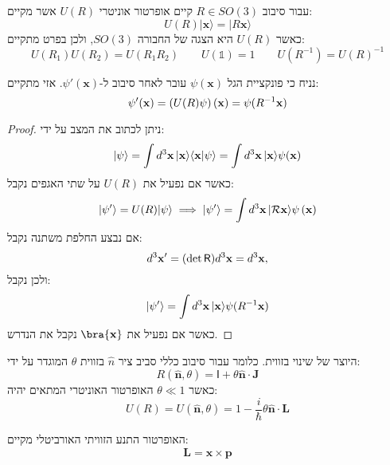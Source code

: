 \documentclass{tstextbook}
\begin{document}
\begin{reminder}
עבור סיבוב \(R \in SO(3)\) קיים אופרטור אוניטרי \(U(R)\) אשר מקיים:
$$U(R)|\mathbf{x}\rangle=|R\mathbf{x}\rangle$$
כאשר \(U(R)\) היא הצגה של החבורה \(SO(3)\), ולכן בפרט מתקיים:
$$U(R_{1})U(R_{2})=U(R_{1}R_{2})\qquad U\left( \mathbb{1}  \right)=1\qquad U(R^{-1})=U(R)^{-1}$$

\end{reminder}
\begin{proposition}
נניח כי פונקציית הגל \(\psi\left( \mathbf{x} \right)\) עובר לאחר סיבוב ל-\(\psi'\left( \mathbf{x} \right)\). אזי מתקיים:
$$\psi^{\prime}({\bf x})=\left(U(R)\psi\right)({\bf x})=\psi(R^{-1}{\bf x})$$

\end{proposition}
\begin{proof}
ניתן לכתוב את המצב על ידי:
$$|\psi\rangle=\int d^{3}{\bf x}\,|{\bf x}\rangle\langle{\bf x}|\psi\rangle=\int d^{3}{\bf x}\,|{\bf x}\rangle\psi({\bf x})$$
כאשר אם נפעיל את \(U(R)\) על שתי האגפים נקבל:
$$|\psi^{\prime}\rangle=U(R)|\psi\rangle\implies|\psi^{\prime}\rangle=\int d^{3}{\bf x}\,|{\cal R}{\bf x}\rangle\psi\left( {\bf x} \right)$$
אם נבצע החלפת משתנה נקבל:
$$d^{3}{\bf x}^{\prime}=(\operatorname*{det}{\sf R})d^{3}{\bf x}=d^{3}{\bf x},$$
ולכן נקבל:
$$|\psi^{\prime}\rangle=\int d^{3}{\bf x}\,|{\bf x}\rangle\psi(R^{-1}{\bf x})$$
כאשר אם נפעיל את \(\bra{\mathbf{x}}\) נקבל את הנדרש.

\end{proof}
\begin{definition}
היוצר של שינוי בזווית. כלומר עבור סיבוב כללי סביב ציר \(\hat{n}\) בזווית \(\theta\) המוגדר על ידי:
$$R\left( \mathbf{\hat{n}},\theta \right)=\mathsf{I}+\theta\mathbf{\hat{n}}\cdot \mathbf{J}$$
כאשר \(\theta\ll 1\) האופרטור האוניטרי המתאים יהיה:
$$U(R)=U(\mathbf{\hat{n}},\theta)=1-{\frac{i}{\hbar}}\theta\mathbf{\hat{n}}\cdot\mathbf{L}$$

\end{definition}
\begin{proposition}
האופרטור התנע הזוויתי האורביטלי מקיים:
$$\mathbf{L}=\mathbf{x}\times\mathbf{p}$$

\end{proposition}
\end{document}
